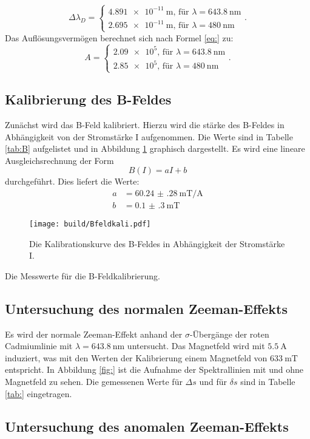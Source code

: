 \[
\Delta\lambda_D =
\begin{cases}
\SI{4.891e-11}{\metre} \text{, für }\lambda=\SI{643.8}{\nano\metre}\\
\SI{2.695e-11}{\metre} \text{, für }\lambda=\SI{480}{\nano\metre}
\end{cases}\text{.}
\]
Das Auflösungsvermögen berechnet sich nach Formel \eqref{eq:} zu:
\[
A = 
\begin{cases}
\num{2.09e5} \text{, für }\lambda=\SI{643.8}{\nano\metre}\\
\num{2.85e5} \text{, für }\lambda=\SI{480}{\nano\metre}
\end{cases}\text{.}
\]

\subsection{Kalibrierung des B-Feldes}

Zunächst wird das B-Feld kalibriert. Hierzu wird die stärke des B-Feldes in Abhängigkeit von der Stromstärke I aufgenommen. Die Werte sind in Tabelle \ref{tab:B} aufgelistet und in Abbildung \ref{fig:B} graphisch dargestellt. Es wird eine lineare Ausgleichsrechnung der Form
\[
B(I) = aI+b
\]
durchgeführt. Dies liefert die Werte:
\begin{align*}
a &= \SI{60.24(28)}{\milli\tesla\per\ampere}\\
b &= \SI{0.1(3)}{\milli\tesla}
\end{align*}

\begin{figure}
	\centering
	\texttt{[image: build/Bfeldkali.pdf]}
	\caption{Die Kalibrationskurve des B-Feldes in Abhängigkeit der Stromstärke I.}
	\label{fig:B}
\end{figure}

\begin{table}
	\centering
	\caption{Die Messwerte für die B-Feldkalibrierung.}
	
	\label{tab:B}
\end{table}

\subsection{Untersuchung des normalen Zeeman-Effekts}

Es wird der normale Zeeman-Effekt anhand der $\sigma$-Übergänge der roten Cadmiumlinie mit $\lambda=\SI{643.8}{\nano\metre}$ untersucht. Das Magnetfeld wird mit $\SI{5.5}{\ampere}$ induziert, was mit den Werten der Kalibrierung einem Magnetfeld von $\SI{633}{\milli\tesla}$ entspricht. In Abbildung \ref{fig:} ist die Aufnahme der Spektrallinien mit und ohne Magnetfeld zu sehen. Die gemessenen Werte für $\Delta s$ und für $\delta s$ sind in Tabelle \ref{tab:} eingetragen. 

\subsection{Untersuchung des anomalen Zeeman-Effekts}